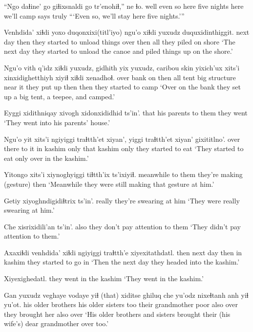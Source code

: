 \documentclass[12pt]{article}
\begin{document}
\gll ``Ngo  daɬine' go   giɬixsnaldi go   tr'enohiɬ,''  ne   ɬo.
well {even so} here {five nights} here {we'll camp} says truly
\glt ```Even so, we'll stay here five nights.'''
\glend

\gll Venhdida' xiɬdi {yoxo duqonxixi(titl'iyo)}             ngu'o xiɬdi yuxudz duquxidinthiggit.
{next day}  then  {they started to unload things} over   then  all    {they piled on shore}
\glt `The next day they started to unload the canoe and piled things up on the shore.'
\glend

\gll Ngu'o vith q'idz xiɬdi yuxudz, {gidhith yix} yuxudz, {caribou skin}  yixich'ux  xits'i xinxidighetthiyh xiyiɬ xiɬdi xenadhoɬ.
over  bank on    then  all    tent {} {}       {big structure}     {near it}  {they put up}  then  then {they started to camp}
\glt `Over on the bank they set up a big tent, a teepee, and camped.'
\glend

\gll Eyggi xidithniqay xivogh {xidonxididhid ts'in'.}
that  {his parents} {to them} {they went}
\glt `They went into his parents' house.'
\glend

\gll Ngu'o yit   xits'i ngiyiggi traɬtth'et xiyan', yiggi traɬtth'et xiyan' gixititlno'.
over  there {to it}  in    kashim     only that kashim only  {they started to eat}
\glt `They started to eat only over in the kashim.'
\glend

\gll Yitongo xits'i    {xiynoghyiggi tiɬtth'ix}     ts'ixiyiɬ.
meanwhile {to them} {they're making (gesture)} then
\glt `Meanwhile they were still making that gesture at him.'
\glend

\gll Getiy  xiyoghndigidiɬtrix ts'in'.
really {they're swearing at him}
\glt `They were really swearing at him.'
\glend

\gll Che {xisrixidili'an ts'in'.}
also {they don't pay attention to them}
\glt `They didn't pay attention to them.'
\glend

\gll Axaxiɬdi venhdida' xiɬdi ngiyiggi traɬtth'e xiyexitathdatl. 
then     {next day} then in     kashim    {they started to go in}
\glt `Then the next day they headed into the kashim.'
\glend

\gll Xiyexighedatl.
{{they went in the kashim}}
\glt `They went in the kashim.'
\glend

\gll Gan yuxudz veghaye            vodaye yiɬ                (that)  xiditse ghiluq      che  yu'odz nixeɬtanh  anh yiɬ  yu'ot.
{} {}      {his older brothers} {his older sisters} too  {} {their grandmother} poor also over {they brought} her also over
\glt `His older brothers and sisters brought their (his wife's) dear grandmother over too.'
\glend
\end{document}
